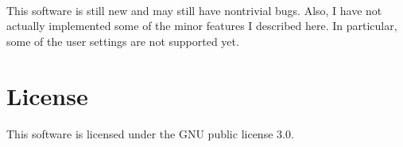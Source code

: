 \documentclass{article}
\begin{document}
\begin{flushleft}
\paragraph{} This software is still new and may still have nontrivial bugs. Also, I have not actually implemented some of the minor features I described here. In particular, some of the user settings are not supported yet.


\section{License}

\paragraph{} This software is licensed under the GNU public license 3.0. 





\end{flushleft}
% 
%
\end{document}
